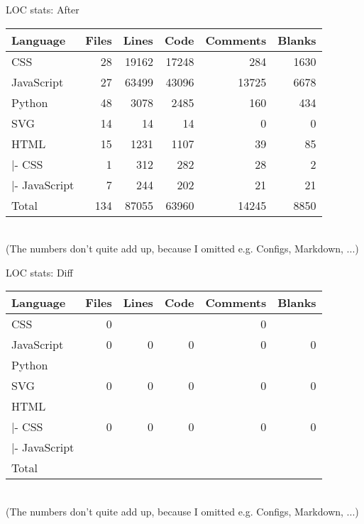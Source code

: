 \begin{frame}[c,fragile]{LOC stats: After}
    \large
    \begin{tabular}{l:r:r:r:r:r}
        Language & Files & Lines & Code & Comments & Blanks \\ \hline
        CSS            &       28   &    19162    &   17248   &      284    &    1630 \\
        JavaScript     &       27   &    63499    &   43096   &    13725    &    6678 \\ \hdashline
        Python         &       48   &     3078    &    2485   &      160    &     434 \\
        SVG            &       14   &       14    &      14   &        0    &       0 \\ \hdashline
        HTML           &       15   &     1231    &    1107   &       39    &      85 \\
        |- CSS         &        1   &      312    &     282   &       28    &       2 \\
        |- JavaScript  &        7   &      244    &     202   &       21    &      21 \\ \hdashline
        Total          &      134   &    87055    &   63960   &    14245    &    8850 \\
    \end{tabular} \\
    \scriptsize \newline (The numbers don't quite add up, because I omitted e.g. Configs, Markdown, ...)
\end{frame}


\begin{frame}[c,fragile]{LOC stats: Diff}
    \large
    \begin{tabular}{l:r:r:r:r:r}
        Language & Files & Lines & Code & Comments & Blanks \\ \hline
        CSS            &        0   &       &     &        0    &     \\
        JavaScript     &        0   &        0    &       0   &        0    &       0  \\ \hdashline
        Python         &      &     &    &      &   \\
        SVG            &        0   &        0    &       0   &        0    &       0  \\ \hdashline
        HTML           &       &      &    &        &    \\
        |- CSS         &        0   &        0    &       0   &        0    &       0  \\
        |- JavaScript  &       &       &     &        &     \\ \hdashline
        Total          &      &     &   &      &   \\
    \end{tabular} \\
    \scriptsize \newline (The numbers don't quite add up, because I omitted e.g. Configs, Markdown, ...)
\end{frame}

